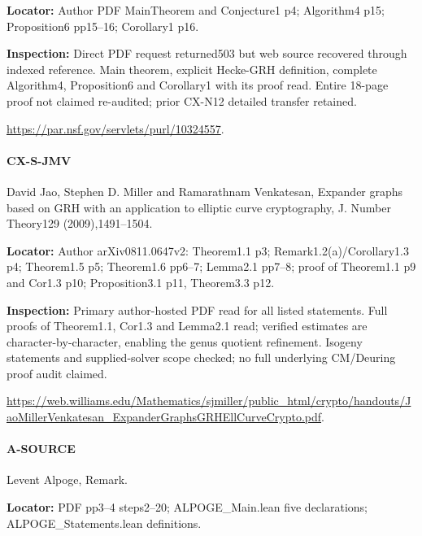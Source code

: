 \documentclass[11pt,a4paper]{article}
\begin{document}
\textbf{Locator:} Author PDF MainTheorem and Conjecture1 p4; Algorithm4 p15; Proposition6 pp15–\allowbreak{}16; Corollary1 p16.

\textbf{Inspection:} Direct PDF request returned503 but web source recovered through indexed reference.\allowbreak{} Main theorem, explicit Hecke-GRH definition, complete Algorithm4, Proposition6 and Corollary1 with its proof read.\allowbreak{} Entire 18-page proof not claimed re-audited; prior CX-N12 detailed transfer retained.\allowbreak{}

\url{https://par.nsf.gov/servlets/purl/10324557}.

\paragraph{CX-S-JMV} David Jao, Stephen D.\allowbreak{} Miller and Ramarathnam Venkatesan, Expander graphs based on GRH with an application to elliptic curve cryptography, J.\allowbreak{} Number Theory129 (2009),1491–\allowbreak{}1504.

\textbf{Locator:} Author arXiv0811.\allowbreak{}0647v2:\allowbreak{} Theorem1.\allowbreak{}1 p3; Remark1.\allowbreak{}2(a)/\allowbreak{}Corollary1.\allowbreak{}3 p4; Theorem1.\allowbreak{}5 p5; Theorem1.\allowbreak{}6 pp6–\allowbreak{}7; Lemma2.\allowbreak{}1 pp7–\allowbreak{}8; proof of Theorem1.\allowbreak{}1 p9 and Cor1.\allowbreak{}3 p10; Proposition3.\allowbreak{}1 p11, Theorem3.\allowbreak{}3 p12.

\textbf{Inspection:} Primary author-hosted PDF read for all listed statements.\allowbreak{} Full proofs of Theorem1.\allowbreak{}1, Cor1.\allowbreak{}3 and Lemma2.\allowbreak{}1 read; verified estimates are character-by-character, enabling the genus quotient refinement.\allowbreak{} Isogeny statements and supplied-solver scope checked; no full underlying CM/\allowbreak{}Deuring proof audit claimed.\allowbreak{}

\url{https://web.williams.edu/Mathematics/sjmiller/public_html/crypto/handouts/JaoMillerVenkatesan_ExpanderGraphsGRHEllCurveCrypto.pdf}.

\paragraph{A-SOURCE} Levent Alpoge, Remark.

\textbf{Locator:} PDF pp3–\allowbreak{}4 steps2–\allowbreak{}20; ALPOGE\_\allowbreak{}Main.\allowbreak{}lean five declarations; ALPOGE\_\allowbreak{}Statements.\allowbreak{}lean definitions.
\end{document}
